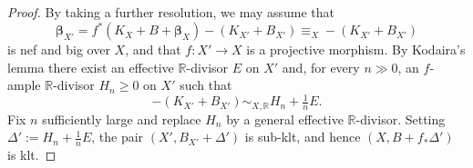 \documentclass[10pt,a4paper]{amsart}
\def\bbeta{\boldsymbol{\beta}}
\begin{document}
\begin{proof}
By taking a further resolution, we may assume that
$$\bbeta_{X'} = f^*(K_X+B+\bbeta_X) - (K_{X'}+B_{X'}) \equiv_{X} -(K_{X'}+B_{X'})$$
is nef and big over $X$, and that $f: X'\to X$ is a projective morphism. By Kodaira's lemma there exist an effective $\mathbb{R}$-divisor $E$ on $X'$
and, for every $n\gg 0$, an $f$-ample $\mathbb{R}$-divisor $H_{n}\geq 0$ on
$X'$ such that
$$
  -(K_{X'}+B_{X'}) \sim_{X,\mathbb{R}} H_{n}+\tfrac{1}{n}E .
$$
Fix $n$ sufficiently large and replace $H_{n}$ by a general effective
$\mathbb{R}$-divisor. Setting
$\Delta' := H_{n}+\tfrac{1}{n}E$, the pair $(X',B_{X'}+\Delta')$ is sub-klt,
and hence $(X,B+f_{*}\Delta')$ is klt.
\end{proof}
\end{document}
